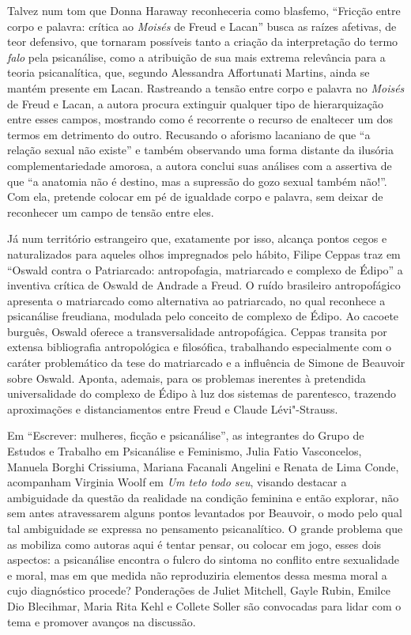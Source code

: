 Talvez num tom que Donna Haraway reconheceria como blasfemo, ``Fricção
entre corpo e palavra: crítica ao \emph{Moisés} de Freud e Lacan'' busca as
raízes afetivas, de teor defensivo, que tornaram possíveis tanto a
criação da interpretação do termo \emph{falo} pela psicanálise, como a
atribuição de sua mais extrema relevância para a teoria psicanalítica,
que, segundo Alessandra Affortunati Martins, ainda se mantém presente em Lacan.
Rastreando a tensão entre corpo e palavra no \emph{Moisés} de Freud e
Lacan, a autora procura extinguir qualquer tipo de hierarquização entre
esses campos, mostrando como é recorrente o recurso de enaltecer um dos
termos em detrimento do outro. Recusando o aforismo lacaniano de que ``a
relação sexual não existe'' e também observando uma forma distante da
ilusória complementariedade amorosa, a autora conclui suas análises com
a assertiva de que ``a anatomia não é destino, mas a supressão do gozo
sexual também não!''. Com ela, pretende colocar em pé de igualdade corpo
e palavra, sem deixar de reconhecer um campo de tensão entre eles.

Já num território estrangeiro que, exatamente por isso, alcança pontos
cegos e naturalizados para aqueles olhos impregnados pelo hábito, Filipe
Ceppas traz em ``Oswald contra o Patriarcado: antropofagia, matriarcado
e complexo de Édipo'' a inventiva crítica de Oswald de Andrade a Freud.
O ruído brasileiro antropofágico apresenta o matriarcado como
alternativa ao patriarcado, no qual reconhece a psicanálise freudiana,
modulada pelo conceito de complexo de Édipo. Ao cacoete burguês, Oswald
oferece a transversalidade antropofágica. Ceppas transita por extensa
bibliografia antropológica e filosófica, trabalhando especialmente com o
caráter problemático da tese do matriarcado e a influência de Simone de Beauvoir
sobre Oswald. Aponta, ademais, para os problemas inerentes à pretendida
universalidade do complexo de Édipo à luz dos sistemas de parentesco,
trazendo aproximações e distanciamentos entre Freud e Claude Lévi"-Strauss.

Em ``Escrever: mulheres, ficção e psicanálise'', as integrantes do Grupo
de Estudos e Trabalho em Psicanálise e Feminismo, Julia Fatio
Vasconcelos, Manuela Borghi Crissiuma, Mariana Facanali Angelini e Renata
de Lima Conde, acompanham Virginia Woolf em \emph{Um teto todo seu}, visando
destacar a ambiguidade da questão da realidade na condição feminina e
então explorar, não sem antes atravessarem alguns pontos levantados por
Beauvoir, o modo pelo qual tal ambiguidade se expressa no
pensamento psicanalítico. O grande problema que as mobiliza como autoras
aqui é tentar pensar, ou colocar em jogo, esses dois aspectos: a
psicanálise encontra o fulcro do sintoma no conflito entre sexualidade e
moral, mas em que medida não reproduziria elementos dessa mesma moral a
cujo diagnóstico procede? Ponderações de Juliet Mitchell, Gayle Rubin,
Emilce Dio Blecihmar, Maria Rita Kehl e Collete Soller são convocadas
para lidar com o tema e promover avanços na discussão.

